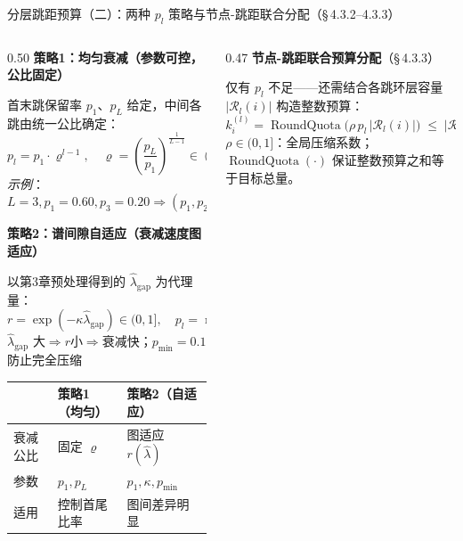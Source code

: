 \documentclass[aspectratio=169,9pt,xcolor=dvipsnames]{beamer}
\newcommand{\blue}[1]{\textcolor{mynavy}{#1}}
\begin{document}
\begin{frame}{分层跳距预算（二）：两种 $p_l$ 策略与节点-跳距联合分配（§\,4.3.2--4.3.3）}
\begin{columns}[T]

\begin{column}{0.50\textwidth}
  \textbf{\blue{策略1：均匀衰减（参数可控，公比固定）}}

  首末跳保留率 $p_1$、$p_L$ 给定，中间各跳由统一公比确定：
  \begin{equation*}
    p_l = p_1\cdot\varrho^{l-1},
    \quad
    \varrho=\!\left(\frac{p_L}{p_1}\right)^{\!\frac{1}{L-1}}\!\in(0,1)
  \end{equation*}
  \textit{示例}：$L=3,p_1=0.60,p_3=0.20\Rightarrow(p_1,p_2,p_3)=(0.60,0.40,0.20)$

  \smallskip
  \textbf{\blue{策略2：谱间隙自适应（衰减速度图适应）}}

  以第3章预处理得到的 $\hat{\lambda}_{\mathrm{gap}}$ 为代理量：
  \begin{equation*}
    r=\exp(-\kappa\hat{\lambda}_{\mathrm{gap}})\in(0,1],
    \quad
    p_l=\max\!\bigl\{p_{\min},\;p_1\cdot r^{l-1}\bigr\}
  \end{equation*}
  $\hat{\lambda}_{\mathrm{gap}}$ 大$\Rightarrow$$r$小$\Rightarrow$衰减快；$p_{\min}=0.1$ 防止完全压缩

  \smallskip
  {\small
  \begin{tabular}{m{1.5cm}m{1.8cm}m{2.0cm}}
    \toprule
    & 策略1（均匀） & 策略2（自适应） \\
    \midrule
    衰减公比 & 固定 $\varrho$ & 图适应 $r(\hat{\lambda})$ \\
    参数 & $p_1,p_L$ & $p_1,\kappa,p_{\min}$ \\
    适用 & 控制首尾比率 & 图间差异明显 \\
    \bottomrule
  \end{tabular}}
\end{column}

\begin{column}{0.47\textwidth}
  \textbf{\blue{节点-跳距联合预算分配}}（§\,4.3.3）

  仅有 $p_l$ 不足——还需结合各跳环层容量 $|\mathcal{R}_l(i)|$ 构造整数预算：
  \begin{equation*}
    k_i^{(l)}=\operatorname{RoundQuota}\!\bigl(\rho\,p_l\,|\mathcal{R}_l(i)|\bigr)
    \;\leq\;|\mathcal{R}_l(i)|
  \end{equation*}
  $\rho\in(0,1]$：全局压缩系数；$\operatorname{RoundQuota}(\cdot)$ 保证整数预算之和等于目标总量。


\end{column}
\end{columns}
\end{frame}
\end{document}
